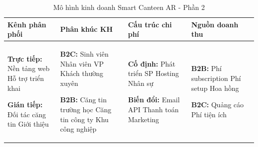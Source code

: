 \documentclass[12pt,a4paper]{article}
\begin{document}
\begin{table}[H]
\centering
\caption{Mô hình kinh doanh Smart Canteen AR - Phần 2}
\label{tab:lean-canvas-2}
\begin{tabular}{|>{\raggedright\arraybackslash}p{3cm}|>{\raggedright\arraybackslash}p{3cm}|>{\raggedright\arraybackslash}p{3cm}|>{\raggedright\arraybackslash}p{3cm}|}
\hline
\textbf{Kênh phân phối} & \textbf{Phân khúc KH} & \textbf{Cấu trúc chi phí} & \textbf{Nguồn doanh thu} \\
\hline
\textbf{Trực tiếp:}
\newline \textbullet{} Nền tảng web
\newline \textbullet{} Hỗ trợ triển khai

\textbf{Gián tiếp:}
\newline \textbullet{} Đối tác căng tin
\newline \textbullet{} Giới thiệu &

\textbf{B2C:}
\newline \textbullet{} Sinh viên
\newline \textbullet{} Nhân viên VP
\newline \textbullet{} Khách thường xuyên

\textbf{B2B:}
\newline \textbullet{} Căng tin trường học
\newline \textbullet{} Căng tin công ty
\newline \textbullet{} Khu công nghiệp &

\textbf{Cố định:}
\newline \textbullet{} Phát triển SP
\newline \textbullet{} Hosting
\newline \textbullet{} Nhân sự

\textbf{Biến đổi:}
\newline \textbullet{} Email API
\newline \textbullet{} Thanh toán
\newline \textbullet{} Marketing &

\textbf{B2B:}
\newline \textbullet{} Phí subscription
\newline \textbullet{} Phí setup
\newline \textbullet{} Hoa hồng

\textbf{B2C:}
\newline \textbullet{} Quảng cáo
\newline \textbullet{} Phí tiện ích \\
\hline
\end{tabular}
\end{table}
\end{document}
